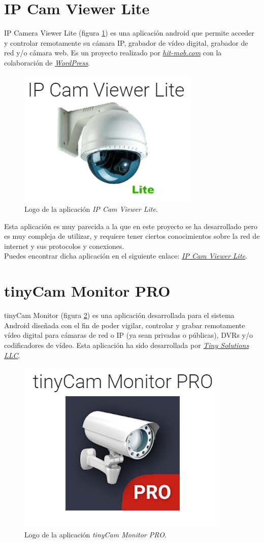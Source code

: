 
\section{IP Cam Viewer Lite}

IP Camera Viewer Lite (figura \ref{fig:hitmob}) es una aplicación android que permite acceder y controlar remotamente su cámara IP, grabador de vídeo digital, grabador de red y/o cámara web. Es un proyecto realizado por \href{https://hit-mob.com}{\textit{hit-mob.com}} con la colaboración de \href{https://wordpress.com}{\textit{WordPress}}.

\begin{figure}[h!]
	\centering
	\includegraphics[width=0.35\linewidth]{img/ipCamViewerLite}
	\caption{Logo de la aplicación \textit{IP Cam Viewer Lite}.}
	\label{fig:hitmob}
\end{figure}

Esta aplicación es muy parecida a la que en este proyecto se ha desarrollado pero es muy compleja de utilizar, y requiere tener ciertos conocimientos sobre la red de internet y sus protocolos y conexiones.\\

Puedes encontrar dicha aplicación en el siguiente enlace: \href{https://play.google.com/store/apps/details?id=com.rcreations.ipcamviewer}{\textit{IP Cam Viewer Lite}}.



\section{tinyCam Monitor PRO}

tinyCam Monitor (figura \ref{fig:tinyCam}) es una aplicación desarrollada para el sistema Android diseñada con el fin de poder vigilar, controlar y grabar remotamente vídeo digital para cámaras de red o IP (ya sean privadas o públicas), DVRs y/o codificadores de vídeo.
Esta aplicación ha sido desarrollada por \href{https://tinysolutionsllc.com}{\textit{Tiny Solutions LLC}}.

\begin{figure}[h!]
	\centering
	\includegraphics[width=0.35\linewidth]{img/tinyCam-Monitor-PRO}
	\caption{Logo de la aplicación \textit{tinyCam Monitor PRO}.}
	\label{fig:tinyCam}
\end{figure} 


